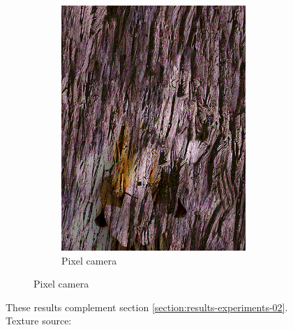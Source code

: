 \begin{figure}[]
\begin{subfigure}{\textwidth}
\begin{subfigure}{0.24\textwidth}
            \includegraphics[width=\textwidth]{images/04-experiment02/human/wood/pixel_proj.jpg}
            \caption*{Pixel camera}
        \end{subfigure}
    \end{subfigure}
    \caption{These results complement section \ref{section:results-experiments-02}. Texture source: \citet{Pixar128}}
    \label{fig:ex02-complete-human-marble_wood}
\end{figure}


